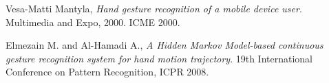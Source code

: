 \documentclass[twoside]{article}
\begin{document}
\begin{multicols}{2}
\begin{thebibliography}{2} %

Vesa-Matti Mantyla, \emph{Hand gesture recognition of a mobile device user}. Multimedia and Expo, 2000. ICME 2000. 

Elmezain M. and Al-Hamadi A., \emph{A Hidden Markov Model-based continuous gesture recognition system for hand motion trajectory}. 19th International Conference on Pattern Recognition, ICPR 2008.

%
\end{thebibliography}


\end{multicols}
\end{document}
